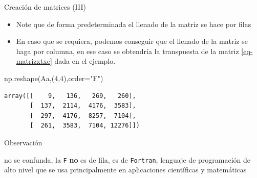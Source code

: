 \documentclass[
  ignorenonframetext,
  aspectratio=169,
  spanish,
]{beamer}
\newenvironment{Shaded}{\begin{snugshade}}{\end{snugshade}}
\newcommand{\DecValTok}[1]{\textcolor[rgb]{0.68,0.00,0.00}{#1}}
\newcommand{\NormalTok}[1]{\textcolor[rgb]{0.00,0.23,0.31}{#1}}
\newcommand{\OperatorTok}[1]{\textcolor[rgb]{0.37,0.37,0.37}{#1}}
\newcommand{\StringTok}[1]{\textcolor[rgb]{0.13,0.47,0.30}{#1}}
\begin{document}
\begin{frame}[fragile]{Creación de matrices (III)}
\label{creaciuxf3n-de-matrices-iii}
\begin{itemize}
\item
  Note que de forma predeterminada el llenado de la matriz se hace por
  filas
\item
  En caso que se requiera, podemos conseguir que el llenado de la matriz
  se haga por columna, en ese caso se obtendría la transpuesta de la
  matriz \ref{eq-matrizxtxe} dada en el ejemplo.
\end{itemize}

\begin{Shaded}
\begin{Highlighting}[]
\NormalTok{np.reshape(Aa,(}\DecValTok{4}\NormalTok{,}\DecValTok{4}\NormalTok{),order}\OperatorTok{=}\StringTok{"F"}\NormalTok{) }
\end{Highlighting}
\end{Shaded}

\begin{verbatim}
array([[    9,   136,   269,   260],
       [  137,  2114,  4176,  3583],
       [  297,  4176,  8257,  7104],
       [  261,  3583,  7104, 12276]])
\end{verbatim}
\end{frame}

\begin{frame}[fragile]{Observación}
\label{observaciuxf3n}
\begin{tcolorbox}[enhanced jigsaw, opacityback=0, title=\textcolor{quarto-callout-note-color}{\faInfo}\hspace{0.5em}{Nota}, leftrule=.75mm, titlerule=0mm, breakable, left=2mm, colbacktitle=quarto-callout-note-color!10!white, rightrule=.15mm, toptitle=1mm, bottomtitle=1mm, arc=.35mm, opacitybacktitle=0.6, coltitle=black, bottomrule=.15mm, colframe=quarto-callout-note-color-frame, colback=white, toprule=.15mm]

no se confunda, la \texttt{F} \textbf{no} es de fila, es de
\texttt{Fortran}, lenguaje de programación de alto nivel que se usa
principalmente en aplicaciones científicas y matemáticas

\end{tcolorbox}
\end{frame}
\end{document}
